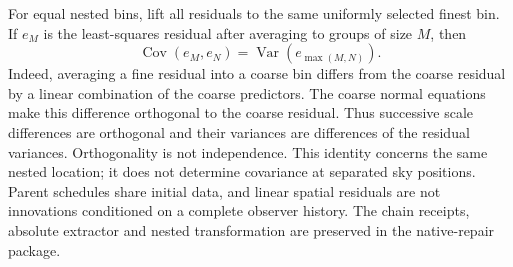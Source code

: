 For equal nested bins, lift all residuals to the same uniformly selected
finest bin. If \(e_M\) is the least-squares residual after averaging to
groups of size \(M\), then
\[
 \operatorname{Cov}(e_M,e_N)=\operatorname{Var}(e_{\max(M,N)}).
\]
Indeed, averaging a fine residual into a coarse bin differs from the
coarse residual by a linear combination of the coarse predictors. The
coarse normal equations make this difference orthogonal to the coarse
residual. Thus successive scale differences are orthogonal and their
variances are differences of the residual variances. Orthogonality is
not independence. This identity concerns the same nested location; it
does not determine covariance at separated sky positions. Parent schedules
share initial data, and linear spatial residuals are not innovations
conditioned on a complete observer history. The chain receipts, absolute
extractor and nested transformation are preserved in the native-repair
package.
